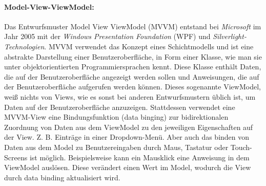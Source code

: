 \documentclass[nomenclature, oneside, 150]{HSMW-Thesis}
\begin{document}
		\paragraph{Model-View-ViewModel:}
			Das Entwurfsmuster Model View ViewModel (MVVM) entstand bei \textit{Microsoft} im Jahr 2005 mit der \textit{Windows Presentation Foundation} (WPF) und \textit{Silverlight-Technologien}. MVVM verwendet das Konzept eines Schichtmodells und ist eine abstrakte Darstellung einer Benutzeroberfläche, in Form einer Klasse, wie man sie unter objektorientierten Programmiersprachen kennt. Diese Klasse enthält Daten, die auf der Benutzeroberfläche angezeigt werden sollen und Anweisungen, die auf der Benutzeroberfläche aufgerufen werden können. Dieses sogenannte ViewModel, weiß nichts von Views, wie es sonst bei anderen Entwurfsmustern üblich ist, um Daten auf der Benutzeroberfläche anzuzeigen. Stattdessen verwendet eine MVVM-View eine Bindungsfunktion (data binging) zur bidirektionalen Zuordnung von Daten aus dem ViewModel zu den jeweiligen Eigenschaften auf der View. Z. B. Einträge in einer Dropdown-Menü. Aber auch das binden von Daten aus dem Model zu Benutzereingaben durch Maus, Tastatur oder Touch-Screens ist möglich. Beispielsweise kann ein Mausklick eine Anweisung in dem ViewModel auslösen. Diese verändert einen Wert im Model, wodurch die View durch data binding aktualisiert wird. \cite{freeman_pro_2017} \cite{bragge_model-view-controller_2013}
\end{document}
